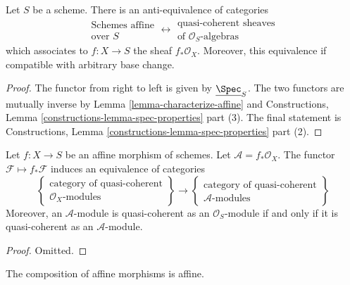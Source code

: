 \begin{lemma}
\label{lemma-affine-equivalence-algebras}
Let $S$ be a scheme. There is an anti-equivalence of categories
$$
\begin{matrix}
\text{Schemes affine} \\
\text{over }S
\end{matrix}
\longleftrightarrow
\begin{matrix}
\text{quasi-coherent sheaves} \\
\text{of }\mathcal{O}_S\text{-algebras}
\end{matrix}
$$
which associates to $f : X \to S$ the sheaf $f_*\mathcal{O}_X$.
Moreover, this equivalence if compatible with arbitrary base change.
\end{lemma}

\begin{proof}
The functor from right to left is given by $\underline{\Spec}_S$.
The two functors are mutually inverse by
Lemma \ref{lemma-characterize-affine} and
Constructions, Lemma \ref{constructions-lemma-spec-properties} part (3).
The final statement is
Constructions, Lemma \ref{constructions-lemma-spec-properties} part (2).
\end{proof}

\begin{lemma}
\label{lemma-affine-equivalence-modules}
Let $f : X \to S$ be an affine morphism of schemes.
Let $\mathcal{A} = f_*\mathcal{O}_X$.
The functor $\mathcal{F} \mapsto f_*\mathcal{F}$ induces
an equivalence of categories
$$
\left\{
\begin{matrix}
\text{category of quasi-coherent}\\
\mathcal{O}_X\text{-modules}
\end{matrix}
\right\}
\longrightarrow
\left\{
\begin{matrix}
\text{category of quasi-coherent}\\
\mathcal{A}\text{-modules}
\end{matrix}
\right\}
$$
Moreover, an $\mathcal{A}$-module is
quasi-coherent as an $\mathcal{O}_S$-module if and only if
it is quasi-coherent as an $\mathcal{A}$-module.
\end{lemma}

\begin{proof}
Omitted.
\end{proof}

\begin{lemma}
\label{lemma-composition-affine}
The composition of affine morphisms is affine.
\end{lemma}

